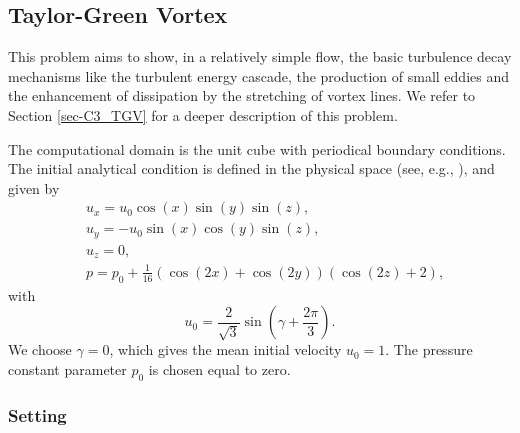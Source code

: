 
\subsection{Taylor-Green Vortex}
\label{subsec-C4_TGV}
This problem aims to show, in a relatively simple flow, the basic turbulence decay mechanisms like the turbulent energy cascade, the production of small eddies and the enhancement of dissipation by the stretching of vortex lines. We refer to Section \ref{sec-C3_TGV} for a deeper description of this problem.

The computational domain is the unit cube with periodical boundary conditions. The initial analytical condition is defined in the physical space (see, e.g., \cite{gassner_accuracy_????}), and given by
\begin{align}
\label{eq-C4_ini_sol_TG}
&u_x=u_0\cos(x)\sin(y)\sin(z),\\\nonumber
&u_y=-u_0\sin(x)\cos(y)\sin(z),\\\nonumber
&u_z=0,\\\nonumber
&p=p_0+\frac{1}{16}\left(\cos(2x)+\cos(2y)\right)\left(\cos(2z)+2\right),
\end{align}
with
$$u_0=\frac{2}{\sqrt{3}}\sin\left(\gamma+\frac{2\pi}{3}\right).$$
We choose $\gamma=0$, which gives the mean initial velocity  $u_0=1$. The pressure constant parameter $p_0$ is chosen equal to zero.

\subsubsection{Setting}

